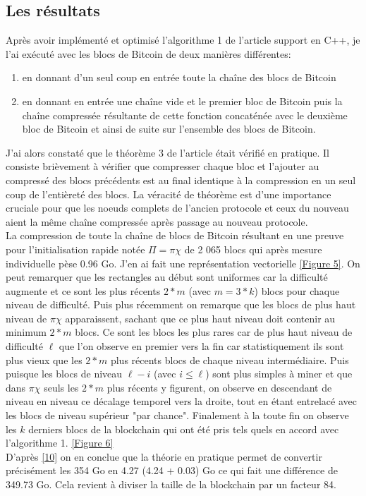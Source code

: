 \documentclass[12pt,a4paper]{article}
\newcommand{\source}[1]{\hyperlink{#1}{[#1]}}
\newcommand{\annexe}[2]{\hyperlink{#1}{[Figure #2]}}
\begin{document}
	\subsection{Les résultats}
	
	Après avoir implémenté et optimisé l'algorithme 1 de l'article support en C++, je l'ai exécuté avec les blocs de Bitcoin de deux manières différentes:\\
	\begin{enumerate}
		\item en donnant d'un seul coup en entrée toute la chaîne des blocs de Bitcoin\\
	  \item en donnant en entrée une chaîne vide et le premier bloc de Bitcoin puis la chaîne compressée résultante de cette fonction concaténée avec le deuxième bloc de Bitcoin et ainsi de suite sur l'ensemble des blocs de Bitcoin.\\
	\end{enumerate}
	
	J'ai alors constaté que le théorème 3 de l'article était vérifié en pratique. Il consiste brièvement à vérifier que compresser chaque bloc et l'ajouter au compressé des blocs précédents est au final identique à la compression en un seul coup de l'entièreté des blocs. La véracité de théorème est d'une importance cruciale pour que les noeuds complets de l'ancien protocole et ceux du nouveau aient la même chaîne compressée après passage au nouveau protocole.\\
	
	La compression de toute la chaîne de blocs de Bitcoin résultant en une preuve pour l'initialisation rapide notée $\Pi = \pi\chi$ de 2 065 blocs qui après mesure individuelle pèse 0.96 Go. J'en ai fait une représentation vectorielle \annexe{25}{5}. On peut remarquer que les rectangles au début sont uniformes car la difficulté augmente et ce sont les plus récents $2*m$ (avec $m = 3*k$) blocs pour chaque niveau de difficulté. Puis plus récemment on remarque que les blocs de plus haut niveau de $\pi\chi$ apparaissent, sachant que ce plus haut niveau doit contenir au minimum $2*m$ blocs. Ce sont les blocs les plus rares car de plus haut niveau de difficulté $\ell$ que l'on observe en premier vers la fin car statistiquement ils sont plus vieux que les $2*m$ plus récents blocs de chaque niveau intermédiaire. Puis puisque les blocs de niveau $\ell - i$ (avec $i \leq \ell$) sont plus simples à miner et que dans $\pi\chi$ seuls les $2*m$ plus récents y figurent, on observe en descendant de niveau en niveau ce décalage temporel vers la droite, tout en étant entrelacé avec les blocs de niveau supérieur "par chance". Finalement à la toute fin on observe les $k$ derniers blocs de la blockchain qui ont été pris tels quels en accord avec l'algorithme 1. \annexe{26}{6}\\ %
D'après \source{10} on en conclue que la théorie en pratique permet de convertir précisément les 354 Go en 4.27 (4.24 + 0.03) Go ce qui fait une différence de 349.73 Go. Cela revient à diviser la taille de la blockchain par un facteur 84.\\
	
\end{document}
